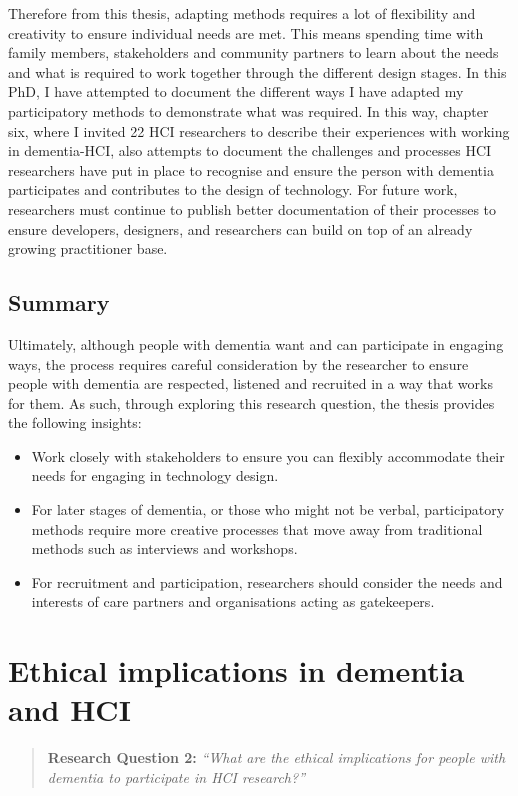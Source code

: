 Therefore from this thesis, adapting methods requires a lot of flexibility and creativity to ensure individual needs are met. This means spending time with family members, stakeholders and community partners to learn about the needs and what is required to work together through the different design stages. In this PhD, I have attempted to document the different ways I have adapted my participatory methods to demonstrate what was required. In this way, chapter six, where I invited 22 HCI researchers to describe their experiences with working in dementia-HCI, also attempts to document the challenges and processes HCI researchers have put in place to recognise and ensure the person with dementia participates and contributes to the design of technology. For future work, researchers must continue to publish better documentation of their processes to ensure developers, designers, and researchers can build on top of an already growing practitioner base.

\subsection{Summary}
\label{RQ1:Summary}
Ultimately, although people with dementia want and can participate in engaging ways, the process requires careful consideration by the researcher to ensure people with dementia are respected, listened and recruited in a way that works for them. As such, through exploring this research question, the thesis provides the following insights:

\begin{itemize}
    \item Work closely with stakeholders to ensure you can flexibly accommodate their needs for engaging in technology design.
    \item For later stages of dementia, or those who might not be verbal, participatory methods require more creative processes that move away from traditional methods such as interviews and workshops.
    \item For recruitment and participation, researchers should consider the needs and interests of care partners and organisations acting as gatekeepers.

\end{itemize}

\section{Ethical implications in dementia and HCI}
\label{Discussion:RQ2}
\begin{quote}
\textbf{    Research Question 2:
}    
\textit{    “What are the ethical implications for people with dementia to participate in HCI research?”}
\end{quote}

